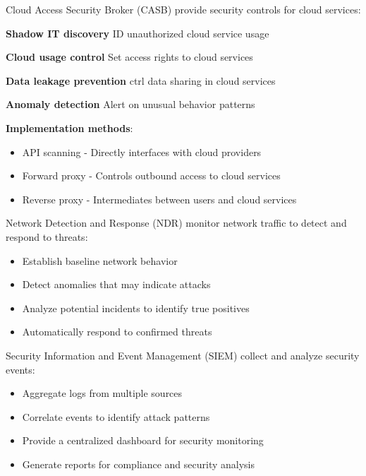 \begin{concept}{Cloud Access Security Broker (CASB)}
provide security controls for cloud services:

\textbf{Shadow IT discovery} ID unauthorized cloud service usage

\textbf{Cloud usage control} Set access rights to cloud services

\textbf{Data leakage prevention} ctrl data sharing in cloud services

\textbf{Anomaly detection} Alert on unusual behavior patterns

\textbf{Implementation methods}:
    \begin{itemize}
        \item API scanning - Directly interfaces with cloud providers
        \item Forward proxy - Controls outbound access to cloud services
        \item Reverse proxy - Intermediates between users and cloud services
    \end{itemize}
\end{concept}




\begin{definition}{Network Detection and Response (NDR)}
monitor network traffic to detect and respond to threats:
\begin{itemize}
    \item Establish baseline network behavior
    \item Detect anomalies that may indicate attacks
    \item Analyze potential incidents to identify true positives
    \item Automatically respond to confirmed threats
\end{itemize}
\end{definition}

\begin{concept}{Security Information and Event Management (SIEM)}
 collect and analyze security events:
\begin{itemize}
    \item Aggregate logs from multiple sources
    \item Correlate events to identify attack patterns
    \item Provide a centralized dashboard for security monitoring
    \item Generate reports for compliance and security analysis
\end{itemize}
\end{concept}

